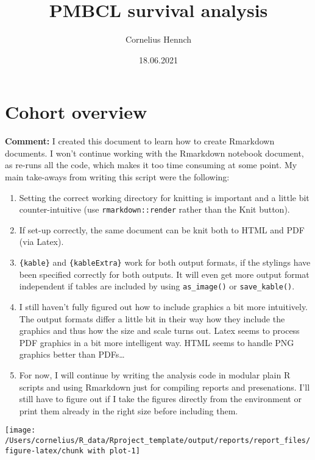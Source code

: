 \documentclass[
  11pt,
]{article}
\title{PMBCL survival analysis}
\author{Cornelius Hennch}
\date{18.06.2021}
\providecommand{\tightlist}{%
  \setlength{\itemsep}{0pt}\setlength{\parskip}{0pt}}
\begin{document}
\maketitle

\hypertarget{cohort-overview}{%
\section{Cohort overview}\label{cohort-overview}}

\textbf{Comment:} I created this document to learn how to create
Rmarkdown documents. I won't continue working with the Rmarkdown
notebook document, as re-runs all the code, which makes it too time
consuming at some point. My main take-aways from writing this script
were the following:

\begin{enumerate}
\def\labelenumi{\arabic{enumi}.}
\tightlist
\item
  Setting the correct working directory for knitting is important and a
  little bit counter-intuitive (use \texttt{rmarkdown::render} rather
  than the Knit button).
\item
  If set-up correctly, the same document can be knit both to HTML and
  PDF (via Latex).
\item
  \texttt{\{kable\}} and \texttt{\{kableExtra\}} work for both output
  formats, if the stylings have been specified correctly for both
  outputs. It will even get more output format independent if tables are
  included by using \texttt{as\_image()} or \texttt{save\_kable()}.
\item
  I still haven't fully figured out how to include graphics a bit more
  intuitively. The output formats differ a little bit in their way how
  they include the graphics and thus how the size and scale turns out.
  Latex seems to process PDF graphics in a bit more intelligent way.
  HTML seems to handle PNG graphics better than PDFs\ldots{}
\item
  For now, I will continue by writing the analysis code in modular plain
  R scripts and using Rmarkdown just for compiling reports and
  presenations. I'll still have to figure out if I take the figures
  directly from the environment or print them already in the right size
  before including them.
\end{enumerate}

\begin{center}\texttt{[image: /Users/cornelius/R\_data/Rproject\_template/output/reports/report\_files/figure-latex/chunk with plot-1]} \end{center}
\end{document}
